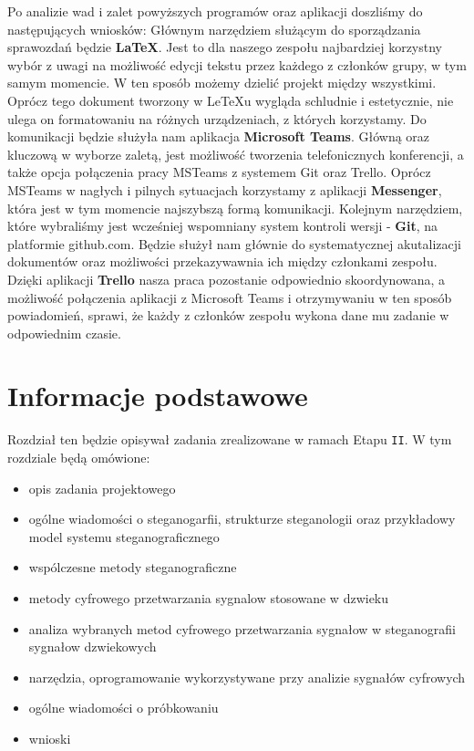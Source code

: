 \documentclass[a4paper,titleauthor]{mwart}
\begin{document}
Po analizie wad i zalet powyższych programów oraz aplikacji doszliśmy do następujących wniosków: \newline
Głównym narzędziem służącym do sporządzania sprawozdań będzie \textbf{LaTeX}. Jest to dla naszego zespołu najbardziej korzystny wybór z uwagi na możliwość edycji tekstu przez każdego z członków grupy, w tym samym momencie. W ten sposób możemy dzielić projekt między wszystkimi. Oprócz tego dokument tworzony w LeTeXu wygląda schludnie i estetycznie, nie ulega on formatowaniu na różnych urządzeniach, z których korzystamy. 
Do komunikacji będzie służyła nam aplikacja \textbf{Microsoft Teams}. Główną oraz kluczową w wyborze zaletą, jest możliwość tworzenia telefonicznych konferencji, a także opcja połączenia pracy MSTeams z systemem Git oraz Trello.
Oprócz MSTeams w nagłych i pilnych sytuacjach korzystamy z aplikacji \textbf{Messenger}, która jest w tym momencie najszybszą formą komunikacji. 
Kolejnym narzędziem, które wybraliśmy jest wcześniej wspomniany system kontroli wersji - \textbf{Git}, na platformie github.com.
Będzie służył nam głównie do systematycznej akutalizacji dokumentów oraz możliwości przekazywawnia ich między członkami zespołu. 
Dzięki aplikacji \textbf{Trello} nasza praca pozostanie odpowiednio skoordynowana, a możliwość połączenia aplikacji z Microsoft Teams i otrzymywaniu w ten sposób powiadomień, sprawi, że każdy z członków zespołu wykona dane mu zadanie w odpowiednim czasie. 

\section{Informacje podstawowe}
\label{sec:informacje_podstawowe} 
Rozdział ten będzie opisywał zadania zrealizowane w ramach Etapu \texttt{II}. W tym rozdziale będą omówione:\newline 
\begin{itemize}
	\item opis zadania projektowego 
	\item ogólne wiadomości o steganogarfii, strukturze steganologii oraz przykładowy model systemu steganograficznego
	\item wspólczesne metody steganograficzne
	\item metody cyfrowego przetwarzania sygnalow stosowane w dzwieku
	\item analiza wybranych metod cyfrowego przetwarzania sygnałow w steganografii sygnałow dzwiekowych
	\item narzędzia, oprogramowanie wykorzystywane przy analizie sygnałów cyfrowych
	\item ogólne wiadomości o próbkowaniu
	\item wnioski
	\end{itemize} 
\end{document}
